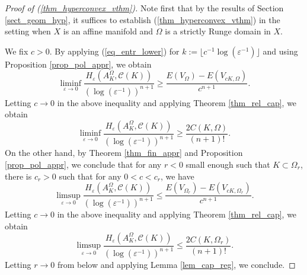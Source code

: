 \documentclass[12pt]{article}
\numberwithin{equation}{section}
\theoremstyle{theorem}
\theoremstyle{definition}
\theoremstyle{remark}
\begin{document}
	\begin{proof}[Proof of (\ref{thm_hyperconvex_vthm})]
		Note first that by the results of Section \ref{sect_geom_hyp}, it suffices to establish (\ref{thm_hyperconvex_vthm}) in the setting when $X$ is an affine manifold and $\Omega$ is a strictly Runge domain in $X$.
		\par 
		We fix $c > 0$.
		By applying (\ref{eq_entr_lower}) for $k := \lfloor c^{-1} \log(\varepsilon^{-1}) \rfloor$ and using Proposition \ref{prop_pol_appr}, we obtain 
		\begin{equation}\label{eq_entr_low_bnd}
			\liminf_{\varepsilon \to 0}
			\frac{H_{\varepsilon}(A_K^{\Omega}, \mathscr{C}(K))}{(\log (\varepsilon^{-1}))^{n + 1}}
			\geq
			\frac{E(V_{\Omega}) - E(V_{c K, \Omega})}{c^{n + 1}}.
		\end{equation}
		Letting $c \to 0$ in the above inequality and applying Theorem \ref{thm_rel_cap}, we obtain
		\begin{equation}
			\liminf_{\varepsilon \to 0}
			\frac{H_{\varepsilon}(A_K^{\Omega}, \mathscr{C}(K))}{(\log (\varepsilon^{-1}))^{n + 1}}
			\geq
			\frac{2 C(K, \Omega)}{(n + 1)!}.
		\end{equation}
		On the other hand, by Theorem \ref{thm_fin_appr} and Proposition \ref{prop_pol_appr}, we conclude that for any $r < 0$ small enough such that $K \subset \Omega_r$, there is $c_r > 0$ such that for any $0 < c < c_r$, we have
		\begin{equation}
			\limsup_{\varepsilon \to 0}
			\frac{H_{\varepsilon}(A_K^{\Omega}, \mathscr{C}(K))}{(\log (\varepsilon^{-1}))^{n + 1}}
			\leq
			\frac{E(V_{\Omega_r}) - E(V_{c K, \Omega_r})}{c^{n + 1}}.
		\end{equation}
		Letting $c \to 0$ in the above inequality and applying Theorem \ref{thm_rel_cap}, we obtain
		\begin{equation}
			\limsup_{\varepsilon \to 0}
			\frac{H_{\varepsilon}(A_K^{\Omega}, \mathscr{C}(K))}{(\log (\varepsilon^{-1}))^{n + 1}}
			\leq
			\frac{2 C(K, \Omega_r)}{(n + 1)!}.
		\end{equation}
		Letting $r \to 0$ from below and applying Lemma \ref{lem_cap_reg}, we conclude.
	\end{proof}
\end{document}
